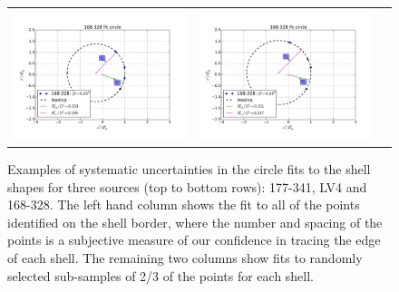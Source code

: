 \begin{figure}
\begin{tabular}{@{}c@{}c@{}c@{}}
  \includegraphics[clip]{../../read-shapes/Multi-Fit/samp00/LV-bowshocks-xyfancy-positionssamp00-168-328} & \includegraphics[clip]{../../read-shapes/Multi-Fit/samp01/LV-bowshocks-xyfancy-positionssamp01-168-328}
\end{tabular}
\caption{Examples of systematic uncertainties in the circle fits to
  the shell shapes for three sources (top to bottom rows): 177-341,
  LV4 and 168-328.  The left hand column shows the fit to all of the
  points identified on the shell border, where the number and spacing
  of the points is a subjective measure of our confidence in tracing
  the edge of each shell. The remaining two columns show fits to
  randomly selected sub-samples of 2/3 of the points for each shell.}
\label{fig:char-radii-obs}
\end{figure}

